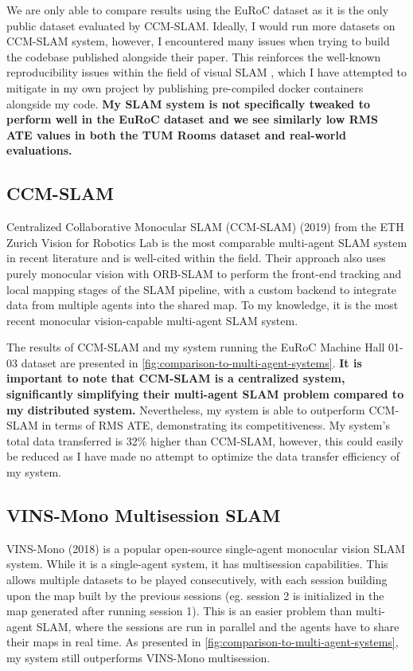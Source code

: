 We are only able to compare results using the EuRoC dataset as it is the only public dataset evaluated by CCM-SLAM. Ideally, I would run more datasets on CCM-SLAM system, however, I encountered many issues when trying to build the codebase published alongside their paper. This reinforces the well-known reproducibility issues within the field of visual SLAM \autocite{DBLP:journals/corr/abs-2108-01654}, which I have attempted to mitigate in my own project by publishing pre-compiled docker containers alongside my code. \textbf{My SLAM system is not specifically tweaked to perform well in the EuRoC dataset and we see similarly low RMS ATE values in both the TUM Rooms dataset and real-world evaluations.}

\subsection{CCM-SLAM}
\label{sec:ccm-slam}
Centralized Collaborative Monocular SLAM (CCM-SLAM) (2019) from the ETH Zurich Vision for Robotics Lab \autocite{schmuck2019ccm} is the most comparable multi-agent SLAM system in recent literature and is well-cited within the field. Their approach also uses purely monocular vision with ORB-SLAM to perform the front-end tracking and local mapping stages of the SLAM pipeline, with a custom backend to integrate data from multiple agents into the shared map. To my knowledge, it is the most recent monocular vision-capable multi-agent SLAM system.

The results of CCM-SLAM and my system running the EuRoC Machine Hall 01-03 dataset are presented in \autoref{fig:comparison-to-multi-agent-systems}. \textbf{It is important to note that CCM-SLAM is a centralized system, significantly simplifying their multi-agent SLAM problem compared to my distributed system.} Nevertheless, my system is able to outperform CCM-SLAM in terms of RMS ATE, demonstrating its competitiveness. My system's total data transferred is 32\% higher than CCM-SLAM, however, this could easily be reduced as I have made no attempt to optimize the data transfer efficiency of my system.

\subsection{VINS-Mono Multisession SLAM}
VINS-Mono (2018) \autocite{8421746} is a popular open-source single-agent monocular vision SLAM system. While it is a single-agent system, it has multisession capabilities. This allows multiple datasets to be played consecutively, with each session building upon the map built by the previous sessions (eg. session 2 is initialized in the map generated after running session 1). This is an easier problem than multi-agent SLAM, where the sessions are run in parallel and the agents have to share their maps in real time. As presented in \autoref{fig:comparison-to-multi-agent-systems}, my system still outperforms VINS-Mono multisession.

